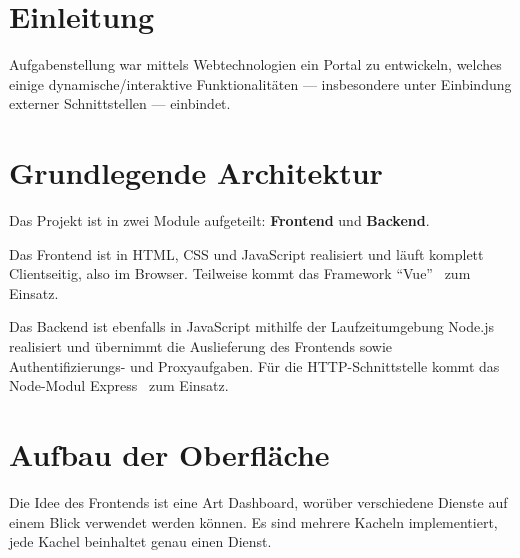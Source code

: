 \documentclass[fleqn,10pt]{SelfArx} %
\affiliation{\textsuperscript{1}\textit{Studiengang Informationstechnik, Fakultät Technik, Duale Schule Baden-Württemberg, Stuttgart}} %
\begin{document}
\flushbottom %

\maketitle %

\tableofcontents %

\thispagestyle{empty} %


\section*{Einleitung} %

Aufgabenstellung war mittels Webtechnologien ein Portal zu entwickeln, welches einige dynamische/interaktive Funktionalitäten --- insbesondere unter Einbindung externer Schnittstellen --- einbindet.

\section{Grundlegende Architektur}
Das Projekt ist in zwei Module aufgeteilt: \textbf{Frontend} und \textbf{Backend}.

Das Frontend ist in HTML, CSS und JavaScript realisiert und läuft komplett Clientseitig, also im Browser. Teilweise kommt das Framework \enquote{Vue}~\cite{vue} zum Einsatz.

Das Backend ist ebenfalls in JavaScript mithilfe der Laufzeitumgebung Node.js~\cite{nodejs} realisiert und übernimmt die Auslieferung des Frontends sowie Authentifizierungs- und Proxyaufgaben. Für die HTTP-Schnittstelle kommt das Node-Modul Express~\cite{express} zum Einsatz.
\section{Aufbau der Oberfläche}
Die Idee des Frontends ist eine Art Dashboard, worüber verschiedene Dienste auf einem Blick verwendet werden können. Es sind mehrere Kacheln implementiert, jede Kachel beinhaltet genau einen Dienst.
\end{document}
